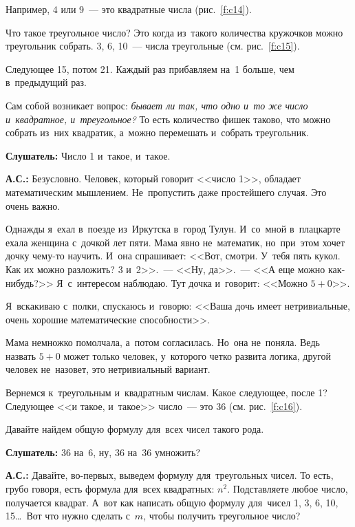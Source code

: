 Например, 4 или 9~--- это квадратные числа (рис.~\ref{f:c14}).


Что такое треугольное число? Это когда из~такого количества кружочков можно
треугольник собрать.
3, 6, 10~--- числа треугольные (см. рис.~\ref{f:c15}).


Следующее 15, потом 21. Каждый раз прибавляем на~1 больше, чем в~предыдущий раз.

Сам собой возникает вопрос: \textit{бывает ли так, что одно и~то же число и~квадратное, и~треугольное?} То
есть количество фишек таково, что можно собрать из~них квадратик, а~можно перемешать и~собрать
треугольник.

\textbf{Слушатель:} Число 1 и~такое, и~такое.

\textbf{А.С.:} Безусловно. Человек, который говорит <<число 1>>, обладает математическим мышлением.
Не~пропустить даже простейшего случая. Это очень важно.

Однажды я~ехал в~поезде из~Иркутска в~город Тулун. И~со~мной в~плацкарте ехала женщина с~дочкой лет
пяти. Мама явно не~математик, но~при~этом хочет дочку чему-то научить. И~она спрашивает: <<Вот,
смотри. У~тебя пять кукол. Как их можно разложить? 3 и~2>>.~--- <<Ну, да>>.~--- <<А еще можно
как-нибудь?>> Я~с~интересом наблюдаю. Тут дочка и~говорит: <<Можно $5+0$>>.

Я~вскакиваю с~полки, спускаюсь и~говорю: <<Ваша дочь имеет нетривиальные, очень хорошие
математические способности>>.


Мама немножко помолчала, а~потом согласилась. Но~она не~поняла. Ведь назвать $5+0$ может только
человек, у~которого четко развита логика, другой человек не~назовет, это нетривиальный вариант.

Вернемся к~треугольным и~квадратным числам. Какое следующее, после 1? Следующее <<и такое,
и~такое>> число~--- это 36 (см. рис.~\ref{f:c16}).



Давайте найдем общую формулу для~всех чисел такого рода.

\textbf{Слушатель:} 36 на~6, ну, 36 на~36 умножить?

\textbf{А.С.:} Давайте, во-первых, выведем формулу для~треугольных чисел. То есть, грубо говоря,
есть формула для~всех квадратных: $n^{2}$. Подставляете любое число, получается квадрат. А~вот как
написать общую формулу для~чисел 1, 3, 6, 10, 15\ldots\ Вот что нужно сделать с~$m$, чтобы получить
треугольное число?

